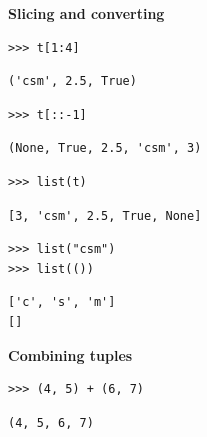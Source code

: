 \begin{blocksection}
\textbf{Slicing and converting}
\begin{lstlisting}
>>> t[1:4]
\end{lstlisting}
\begin{solution}[.3in]
\begin{lstlisting}
('csm', 2.5, True)
\end{lstlisting}
\end{solution}
\end{blocksection}

\begin{blocksection}
\begin{lstlisting}
>>> t[::-1]
\end{lstlisting}
\begin{solution}[.3in]
\begin{lstlisting}
(None, True, 2.5, 'csm', 3)
\end{lstlisting}
\end{solution}
\end{blocksection}

\begin{blocksection}
\begin{lstlisting}
>>> list(t)
\end{lstlisting}
\begin{solution}[.3in]
\begin{lstlisting}
[3, 'csm', 2.5, True, None]
\end{lstlisting}
\end{solution}
\end{blocksection}

\begin{blocksection}
\begin{lstlisting}
>>> list("csm")
>>> list(())
\end{lstlisting}
\begin{solution}[.45in]
\begin{lstlisting}
['c', 's', 'm']
[]
\end{lstlisting}
\end{solution}
\end{blocksection}

\begin{blocksection}
\textbf{Combining tuples}
\begin{lstlisting}
>>> (4, 5) + (6, 7)
\end{lstlisting}
\begin{solution}[.3in]
\begin{lstlisting}
(4, 5, 6, 7)
\end{lstlisting}
\end{solution}
\end{blocksection}

